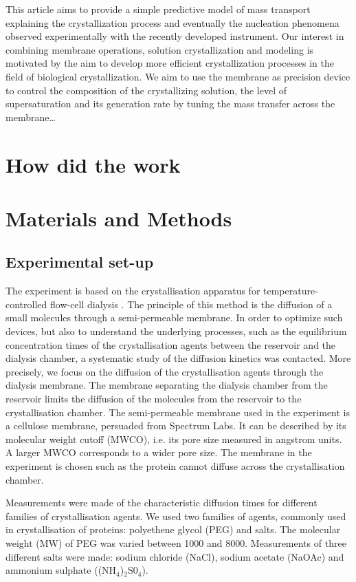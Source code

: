 \documentclass[11ptm,oneside,a4paper]{report}
\begin{document}
This article aims to provide a simple predictive model of mass transport explaining the crystallization process and eventually the nucleation phenomena observed experimentally with the recently developed instrument. 
Our interest in combining membrane operations, solution crystallization and modeling is motivated by the aim to develop more efficient crystallization processes in the field of biological crystallization. We aim to use the membrane as precision device to control the composition of the crystallizing solution, the level of supersaturation and its generation rate by tuning the mass transfer across the membrane… 

\section{How did the work}

\section{Materials and Methods} \label{methods}

\subsection{Experimental set-up}

The experiment is based on the crystallisation apparatus for temperature-controlled flow-cell dialysis
\cite{Junius:ei5002}. The principle of this method is the diffusion of a small molecules through a semi-permeable membrane. 
In order to optimize such devices, but also to understand the underlying processes, such as the equilibrium concentration times of the crystallisation agents between the reservoir and the dialysis chamber, 
a systematic study of the diffusion kinetics was contacted. 
More precisely, we focus on the diffusion of the crystallisation agents through the dialysis membrane. 
The membrane separating the dialysis chamber from the reservoir limits the diffusion of the molecules from the
reservoir to the crystallisation chamber. The semi-permeable membrane used in the experiment is a cellulose membrane, persuaded from Spectrum Labs. It can be described by its molecular weight cutoff (MWCO), i.e. its pore size measured in angstrom units. A larger MWCO corresponds to a wider pore size. The membrane in the experiment is chosen such as the protein cannot diffuse across the crystallisation chamber. 

Measurements were made of the characteristic diffusion times for different families of crystallisation agents. 
We used two families of agents, commonly used in crystallisation of proteins: 
polyethene glycol (PEG) and salts. The molecular weight (MW)
of PEG was varied between 1000 and 8000. Measurements of three different salts were made: 
sodium chloride (NaCl), sodium acetate (NaOAc) and ammonium sulphate ((NH$_4$)$_2$S0$_4$).  
\end{document}
